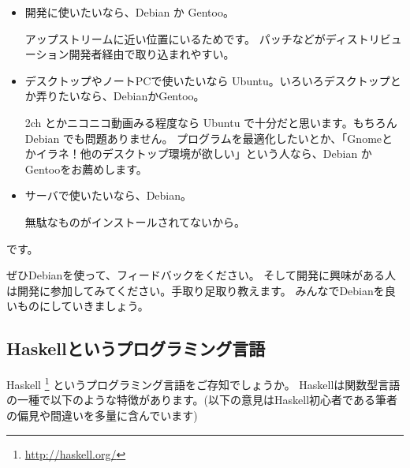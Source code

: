 \documentclass[mingoth,a4paper]{jsarticle}
\begin{document}
\begin{itemize}
\item 開発に使いたいなら、Debian か Gentoo。

アップストリームに近い位置にいるためです。
パッチなどがディストリビューション開発者経由で取り込まれやすい。

\item デスクトップやノートPCで使いたいなら Ubuntu。いろいろデスクトップとか弄りたいなら、DebianかGentoo。

2ch とかニコニコ動画みる程度なら Ubuntu で十分だと思います。もちろん Debian でも問題ありません。
プログラムを最適化したいとか、「Gnomeとかイラネ！他のデスクトップ環境が欲しい」という人なら、Debian かGentooをお薦めします。

\item サーバで使いたいなら、Debian。

無駄なものがインストールされてないから。

\end{itemize}
です。

ぜひDebianを使って、フィードバックをください。
そして開発に興味がある人は開発に参加してみてください。手取り足取り教えます。
みんなでDebianを良いものにしていきましょう。



\subsection{Haskellというプログラミング言語}

Haskell \footnote{\url{http://haskell.org/}}
というプログラミング言語をご存知でしょうか。
Haskellは関数型言語の一種で以下のような特徴があります。(以下の意見はHaskell初心者である筆者の偏見や間違いを多量に含んでいます)
\end{document}
